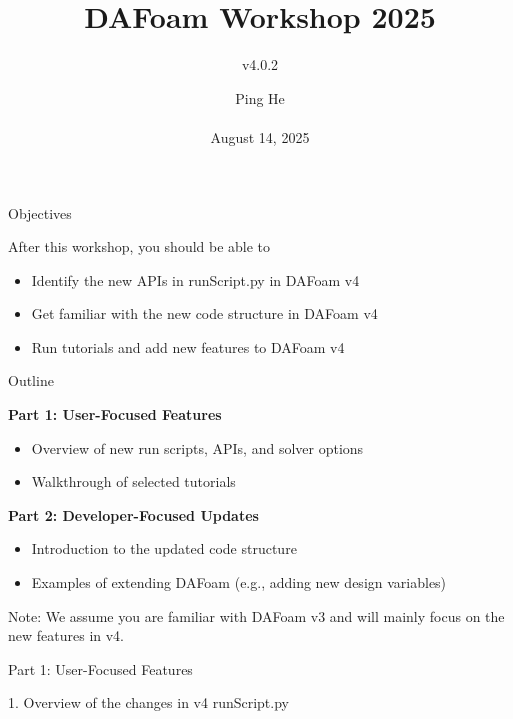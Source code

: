\documentclass{bredelebeamer}
\title[ ]{DAFoam Workshop 2025}
\subtitle{v4.0.2}
\author{Ping He\\ ~ \\August 14, 2025 }
\date[August 14, 2025]{}
\begin{document}
\begin{frame}
  \titlepage
\end{frame}



\begin{frame}{Objectives}

After this workshop, you should be able to
\begin{itemize}
  \setlength\itemsep{1em}
 \item Identify the new APIs in runScript.py in DAFoam v4
 \item Get familiar with the new code structure in DAFoam v4 
 \item Run tutorials and add new features to DAFoam v4
\end{itemize} 

\end{frame}


\begin{frame}{Outline}

\textbf{Part 1: User-Focused Features}
\begin{itemize}
  \setlength\itemsep{1em}
 \item Overview of new run scripts, APIs, and solver options
 \item Walkthrough of selected tutorials
\end{itemize}

\textbf{Part 2: Developer-Focused Updates}
\begin{itemize}
  \setlength\itemsep{1em}
 \item Introduction to the updated code structure
 \item Examples of extending DAFoam (e.g., adding new design variables)
\end{itemize}

Note: We assume you are familiar with DAFoam v3 and will mainly focus on the new features in v4.

\end{frame}


\begin{frame}{Part 1: User-Focused Features}

\begin{center}
   \large{1. Overview of the changes in v4 runScript.py}
\end{center}

\end{frame}
\end{document}
